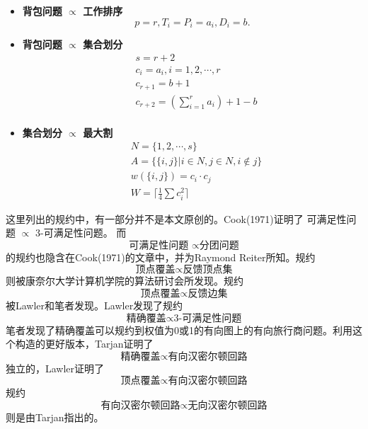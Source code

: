 \documentclass[twocolumn]{article}
\theoremstyle{nonumberplain}%
\begin{document}
\begin{itemize}
    \item {\bf 背包问题 $\propto$ 工作排序}
        $$p=r, T_i=P_i=a_i, D_i=b.$$

    \item {\bf 背包问题 $\propto$ 集合划分}
        \begin{equation}\nonumber %
        \begin{aligned}
        &s=r+2\\
        &c_i=a_i,i=1,2,\cdots,r\\
        &c_{r+1}=b+1\\
        &c_{r+2}=(\sum_{i=1}^{r}a_i)+1-b\\
        \end{aligned}
        \end{equation}

    \item {\bf 集合划分 $\propto$ 最大割}
        \begin{equation}\nonumber %
        \begin{aligned}
        &N=\{1,2,\cdots,s\}\\
        &A=\{\{i,j\}|i\in N,j\in N,i\notin j\}\\
        &w(\{i,j\})=c_i\cdot c_j\\
        &W=\lceil \frac14\sum c_i^2\rceil
        \end{aligned}
        \end{equation}

    \end{itemize}
    这里列出的规约中，有一部分并不是本文原创的。Cook(1971)证明了 可满足性问题 $\propto$ 3-可满足性问题。 而
    $$\text{可满足性问题 }\propto \text{分团问题}$$
    的规约也隐含在Cook(1971)的文章中，并为Raymond Reiter所知。规约$$ \text{顶点覆盖}\propto\text{反馈顶点集}$$则被康奈尔大学计算机学院的算法研讨会所发现。规约$$ \text{顶点覆盖}\propto\text{反馈边集}$$ 被Lawler和笔者发现。Lawler发现了规约
    $$\text{精确覆盖}\propto\text{3-可满足性问题}$$笔者发现了精确覆盖可以规约到权值为0或1的有向图上的有向旅行商问题。利用这个构造的更好版本，Tarjan证明了$$\text{精确覆盖}\propto\text{有向汉密尔顿回路}$$独立的，Lawler证明了$$\text{顶点覆盖}\propto\text{有向汉密尔顿回路}$$规约$$\text{有向汉密尔顿回路}\propto\text{无向汉密尔顿回路}$$则是由Tarjan指出的。
\end{document}
